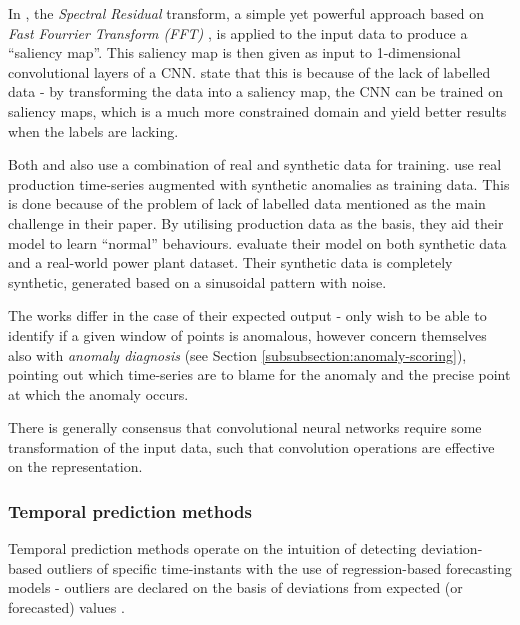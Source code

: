 \documentclass{mproj}
\begin{document}
In \cite{MicrosoftTimeSeries}, the \textit{Spectral Residual} transform, a simple yet powerful approach based on \textit{Fast Fourrier Transform (FFT)} \citep{MicrosoftTimeSeries}, is applied to the input data to produce a ``saliency map''. This saliency map is then given as input to 1-dimensional convolutional layers of a CNN. \cite{MicrosoftTimeSeries} state that this is because of the lack of labelled data - by transforming the data into a saliency map, the CNN can be trained on saliency maps, which is a much more constrained domain and yield better results when the labels are lacking.

Both \cite{deepMultivariateNetwork} and \cite{MicrosoftTimeSeries} also use a combination of real and synthetic data for training. 
\cite{MicrosoftTimeSeries} use real production time-series augmented with synthetic anomalies as training data. This is done because of the problem of lack of labelled data mentioned as the main challenge in their paper. By utilising production data as the basis, they aid their model to learn ``normal'' behaviours.
\cite{deepMultivariateNetwork} evaluate their model on both synthetic data and a real-world power plant dataset. Their synthetic data is completely synthetic, generated based on a sinusoidal pattern with noise.

The works differ in the case of their expected output - \cite{MicrosoftTimeSeries} only wish to be able to identify if a given window of points is anomalous, however \cite{deepMultivariateNetwork} concern themselves also with \textit{anomaly diagnosis} (see Section \ref{subsubsection:anomaly-scoring}), pointing out which time-series are to blame for the anomaly and the precise point at which the anomaly occurs.

There is generally consensus that convolutional neural networks require some transformation of the input data, such that convolution operations are effective on the representation.

\subsubsection{Temporal prediction methods}
\label{subsubsection:temporalprediction}

Temporal prediction methods operate on the intuition of detecting deviation-based outliers of specific time-instants with the use of regression-based forecasting models - outliers are declared on the basis of deviations from expected (or forecasted) values \citep{outlierAnalysisBook}.
\end{document}
